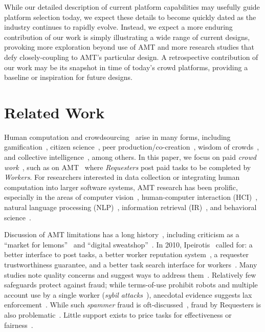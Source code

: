 \documentclass{sigchi}
\begin{document}
While our detailed description of current platform capabilities may usefully guide platform selection today, we expect these details to become quickly dated as the industry continues to rapidly evolve. Instead, we expect a more enduring contribution of our work is simply illustrating a wide range of current designs, provoking more exploration beyond use of AMT and more research studies that defy closely-coupling to AMT's particular design. 
A retrospective contribution of our work may be its snapshot in time of today's crowd platforms, providing a baseline or inspiration for future designs.







\section{Related Work}

Human computation and crowdsourcing~\cite{Quinn11,Grier05,Law11,Davis10,Howe06} arise in many forms, including gamification~\cite{von2004labeling}, citizen science~\cite{evans2007archives}, peer production/co-creation~\cite{viegas2007hidden}, wisdom of crowds~\cite{Surowiecki05}, and collective intelligence~\cite{ci2012}, among others. In this paper, we focus on paid {\em crowd work}~\cite{Kittur13}, such as on AMT~\cite{barr2006ai,Mieszkowski06,paolacci2010running} where {\em Requesters} post paid tasks to be completed by {\em Workers}. For researchers interested in data collection or integrating human computation into larger software systems, AMT research has been prolific, especially in the areas of computer vision~\cite{sorokin2008utility}, human-computer interaction (HCI)~\cite{Kittur08}, natural language processing (NLP)~\cite{Snow08}, information retrieval (IR)~\cite{Alonso08}, and behavioral science~\cite{buhrmester2011amazon,mason2012conducting}. 



Discussion of AMT limitations has a long history~\cite{atwood2007amazon,Mims10}, including criticism as a ``market for lemons''~\cite{Ipeirotis-lemons} and ``digital sweatshop''~\cite{Cushing13}. In 2010, Ipeirotis~\cite{panos2010pleatoamazon} called for: a better interface to post tasks, a better worker reputation system~\cite{ipeirotis-be-a-top-worker}, a requester trustworthiness guarantee, and a better task search interface for workers~\cite{chilton2010task}. Many studies note quality concerns and suggest ways to address them~\cite{Ipeirotis:Wang:2010,dow2012shepherding}. Relatively few safeguards protect against fraud; while terms-of-use prohibit robots and multiple account use by a single worker ({\em sybil attacks}~\cite{levine2006survey}), anecdotal evidence suggests lax enforcement~\cite{McCreadie-CSE2010,zhu10}. While such {\em spammer} fraud is oft-discussed~\cite{Kittur08,downs2010your,heymann2011turkalytics,difallah2012mechanical,raykar2012eliminating,Eickhoff13}, fraud by Requesters is also problematic~\cite{panos2010pleatoamazon,tn-avoid}. Little support exists to price tasks for effectiveness or fairness~\cite{Mason:Watts:2009,faridani2011s,singer2011pricing}. 
\end{document}
